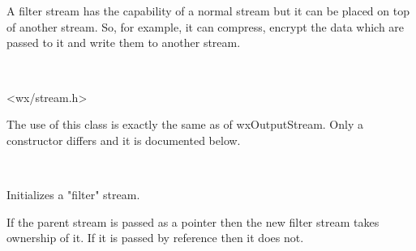 \section{}\label{wxfilteroutputstream}

A filter stream has the capability of a normal
stream but it can be placed on top of another stream. So, for example, it
can compress, encrypt the data which are passed to it and write them to another
stream.


\\


<wx/stream.h>




The use of this class is exactly the same as of wxOutputStream. Only a constructor
differs and it is documented below.


\\


\label{wxfilteroutputstreamctor}



Initializes a "filter" stream.

If the parent stream is passed as a pointer then the new filter stream
takes ownership of it. If it is passed by reference then it does not.

